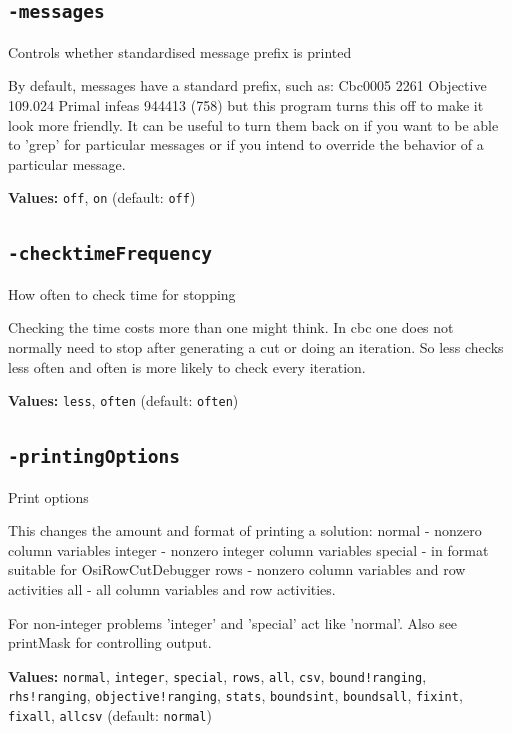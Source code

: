 \documentclass[11pt,a4paper]{article}
\begin{document}
\subsection*{\texttt{-messages}}

Controls whether standardised message prefix is printed

By default, messages have a standard prefix, such as:
   Cbc0005 2261  Objective 109.024 Primal infeas 944413 (758)
but this program turns this off to make it look more friendly.  It can be useful to turn them back on if you want to be able to 'grep' for particular messages or if you intend to override the behavior of a particular message.

\textbf{Values:} \texttt{off}, \texttt{on} (default: \texttt{off})

\subsection*{\texttt{-checktimeFrequency}}

How often to check time for stopping

Checking the time costs more than one might think. In cbc one does not normally need to stop after generating a cut or doing an iteration. So less checks less often and often is more likely to check every iteration.

\textbf{Values:} \texttt{less}, \texttt{often} (default: \texttt{often})

\subsection*{\texttt{-printingOptions}}

Print options

This changes the amount and format of printing a solution:
 normal - nonzero column variables 
integer - nonzero integer column variables
 special - in format suitable for OsiRowCutDebugger
 rows - nonzero column variables and row activities
 all - all column variables and row activities.

 For non-integer problems 'integer' and 'special' act like 'normal'.  Also see printMask for controlling output.

\textbf{Values:} \texttt{normal}, \texttt{integer}, \texttt{special}, \texttt{rows}, \texttt{all}, \texttt{csv}, \texttt{bound!ranging}, \texttt{rhs!ranging}, \texttt{objective!ranging}, \texttt{stats}, \texttt{boundsint}, \texttt{boundsall}, \texttt{fixint}, \texttt{fixall}, \texttt{allcsv} (default: \texttt{normal})
\end{document}
